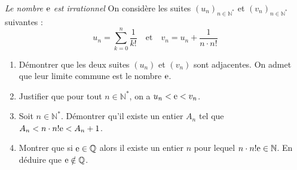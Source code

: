 \documentclass[]{exercices}
\begin{document}
\begin{exercice}[\di] \emph{Le nombre $\mathrm{e}$ est irrationnel}
	On considère les suites $(u_n)_{n\in\mathbb{N}^*}$ et $(v_n)_{n\in\mathbb{N}^*}$ suivantes :
	\[u_n=\sum_{k=0}^{n}\dfrac{1}{k!} \quad \text{et} \quad v_n=u_n+\frac1{n\cdot n!} \]
	\begin{enumerate}
		\item Démontrer que les deux suites $(u_n)$ et $(v_n)$ sont adjacentes. On admet que leur limite commune est le nombre $\mathrm{e}$.
		\item Justifier que pour tout $n\in\mathbb{N}^*$, on a $u_n<\mathrm{e}<v_n$.
		\item Soit $n\in\mathbb{N}^*$. Démontrer qu'il existe un entier $A_n$ tel que $A_n<n\cdot n!\mathrm{e}<A_n+1$.
		\item Montrer que si $\mathrm{e}\in\mathbb{Q}$ alors il existe un entier $n$ pour lequel $n\cdot n!\mathrm{e}\in\mathbb{N}$. En déduire que $\mathrm{e}\notin\mathbb{Q}$.
	\end{enumerate}
\end{exercice}
\end{document}
